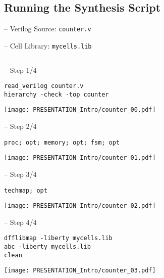 
\subsection{Running the Synthesis Script}

\begin{frame}[fragile]{\subsecname{} -- Verilog Source: \tt counter.v}

\end{frame}

\begin{frame}[fragile]{\subsecname{} -- Cell Library: \tt mycells.lib}
\begin{columns}
\column[t]{5cm}

\column[t]{5cm}

\end{columns}
\end{frame}

\begin{frame}[t, fragile]{\subsecname{} -- Step 1/4}
\begin{verbatim}
read_verilog counter.v
hierarchy -check -top counter
\end{verbatim}

\vfill
\texttt{[image: PRESENTATION\_Intro/counter\_00.pdf]}
\end{frame}

\begin{frame}[t, fragile]{\subsecname{} -- Step 2/4}
\begin{verbatim}
proc; opt; memory; opt; fsm; opt
\end{verbatim}

\vfill
\texttt{[image: PRESENTATION\_Intro/counter\_01.pdf]}
\end{frame}

\begin{frame}[t, fragile]{\subsecname{} -- Step 3/4}
\begin{verbatim}
techmap; opt
\end{verbatim}

\vfill
\texttt{[image: PRESENTATION\_Intro/counter\_02.pdf]}
\end{frame}

\begin{frame}[t, fragile]{\subsecname{} -- Step 4/4}
\begin{verbatim}
dfflibmap -liberty mycells.lib
abc -liberty mycells.lib
clean
\end{verbatim}

\vfill
\texttt{[image: PRESENTATION\_Intro/counter\_03.pdf]}
\end{frame}

